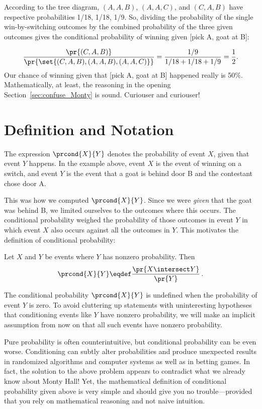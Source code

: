According to the tree diagram, $(A, A, B)$, $(A, A, C)$, and $(C, A,
B)$ have respective probabilities 1/18, 1/18, 1/9.  So, dividing the
probability of the single win-by-switching outcomes by the combined
probability of the three given outcomes gives the conditional
probability of winning given [pick A, goat at B]:
\iffalse A Monty Hall game has a
\[
\frac{1}{18} + \frac{1}{18} + \frac{1}{9} = \frac{2}{9}
\]
chance of ending in one of these outcomes.  This 2/9 fraction is all
we need; we can ignore all other outcomes on the tree.
\fi
\[ 
\frac{\pr{(C, A, B)}}{\pr{\set{(C, A, B),(A, A,
    B),(A, A, C)}}} = \frac{1/9}{1/18 + 1/18 + 1/9}=\frac{1}{2}.
\]
Our chance of winning given that [pick A, goat at B] happened
really is 50\%.  Mathematically, at least, the reasoning in the
opening Section~\ref{sec:confuse_Monty} is sound.  Curiouser and
curiouser!

\section{Definition and Notation}

The expression $\prcond{X}{Y}$ denotes the probability of event $X$,
given that event $Y$ happens.  In the example above, event $X$ is the
event of winning on a switch, and event $Y$ is the event that a goat
is behind door B and the contestant chose door A.

This was how we computed $\prcond{X}{Y}$.  Since we were \emph{given} that
the goat was behind B, we limited ourselves to the outcomes where this
occurs.  The conditional probability weighed the probability of those
outcomes in event $Y$ in which event $X$ also occurs against all the
outcomes in $Y$.  This motivates the definition of conditional
probability:
\begin{definition}\label{LN12:prcond}
Let $X$ and $Y$ be events where $Y$ has nonzero probability.  Then
\[
\prcond{X}{Y} \eqdef \frac{\pr{X \intersect Y}}{\pr{Y}}\,.
\]
\end{definition}

The conditional probability $\prcond{X}{Y}$ is undefined when the
probability of event $Y$ is zero.  To avoid cluttering up statements
with uninteresting hypotheses that conditioning events like $Y$ have
nonzero probability, we will make an implicit assumption from now on
that all such events have nonzero probability.

Pure probability is often counterintuitive, but conditional
probability can be even worse.  Conditioning can subtly alter
probabilities and produce unexpected results in randomized algorithms
and computer systems as well as in betting games.  In fact, the
solution to the above problem appears to contradict what we already
know about Monty Hall!  Yet, the mathematical definition of
conditional probability given above is very simple and should give you
no trouble---provided that you rely on mathematical reasoning and not
naive intuition.

